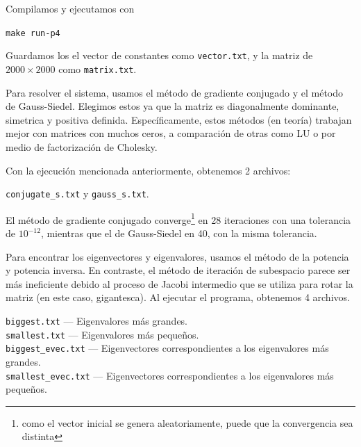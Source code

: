 \begin{solution}

	Compilamos y ejecutamos con
	\begin{center}
		\texttt{make run-p4}
	\end{center}
	Guardamos los el vector de constantes como \texttt{vector.txt}, y la matriz de $ 2000\times 2000 $ como \texttt{matrix.txt}.

	Para resolver el sistema, usamos el m\'etodo de gradiente conjugado y el
	m\'etodo de Gauss-Siedel. Elegimos estos ya que la matriz es diagonalmente
	dominante, simetrica y positiva definida. Espec\'ificamente, estos m\'etodos
	(en teor\'ia) trabajan mejor con matrices con muchos ceros, a comparaci\'on
	de otras como LU o por medio de factorizaci\'on de Cholesky.

	Con la ejecuci\'on mencionada anteriormente, obtenemos 2 archivos:
	\begin{center}
		\texttt{conjugate\_s.txt} y \texttt{gauss\_s.txt}.
	\end{center}
	El m\'etodo de gradiente conjugado converge\footnote{como el vector inicial se genera aleatoriamente, puede que la convergencia sea distinta} en 28 iteraciones con una tolerancia de $ 10^{-12} $, mientras que el de Gauss-Siedel en 40, con la misma tolerancia.

	Para encontrar los eigenvectores y eigenvalores, usamos el m\'etodo de la
	potencia y potencia inversa. En contraste, el m\'etodo de iteraci\'on de
	subespacio parece ser m\'as ineficiente debido al proceso de Jacobi
	intermedio que se utiliza para rotar la matriz (en este caso, gigantesca). Al ejecutar el programa, obtenemos 4 archivos.

	\begin{center}
		\texttt{biggest.txt} --- Eigenvalores m\'as grandes.\\
		\texttt{smallest.txt} --- Eigenvalores m\'as peque\~nos.\\
		\texttt{biggest\_evec.txt} --- Eigenvectores correspondientes a los eigenvalores m\'as grandes.\\
		\texttt{smallest\_evec.txt} --- Eigenvectores correspondientes a los eigenvalores m\'as peque\~nos.
	\end{center}


\end{solution}
